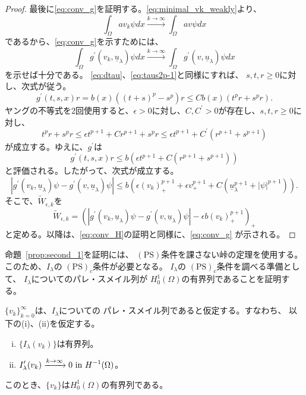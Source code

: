 \begin{proof}
 最後に\eqref{eq:conv_g}を証明する。\eqref{eq:minimal_vk_weakly}より、
 \[
  \int_\Omega a v_k \psi dx \xrightarrow{k \to \infty} \int_\Omega
 av\psi dx
 \]
 であるから、\eqref{eq:conv_g}を示すためには、
 \[
  \int_\Omega g^\prime(v_k, \underline{u}_\lambda)\psi dx \xrightarrow{
  k \to \infty } 
  \int_\Omega g^\prime(v, \underline{u}_\lambda)\psi dx
 \]
 を示せば十分である。
 \eqref{eq:dtau}、\eqref{eq:taus2p-1}と同様にすれば、
 $s, t, r \geq 0$に対し、次式が従う。
 \[
  g^\prime(t, s, x)r = b(x) \left( (t+s)^p - s^p \right) r \leq C b(x)
 \left( t^pr + s^p r \right).
 \]
 ヤングの不等式を$2$回使用すると、$\epsilon > 0$に対し、$C, C^\prime >
 0$が存在し、$s, t, r \geq 0$に対し、
 \[
  t^p r + s^p r \leq \epsilon t^{p+1} + C r^{p+1} + s^p r \leq
 \epsilon t^{p+1} + C^\prime (r^{p+1} + s^{p+1})
 \]
 が成立する。ゆえに、$g^\prime$は
 \[
  g^\prime(t, s, x)r \leq b \left( \epsilon t^{p+1} + C ( r^{p+1} +
 s^{p+1}) \right)
 \]
 と評価される。したがって、次式が成立する。
 \[  
  \left\lvert g^\prime(v_k, \underline{u}_\lambda)\psi - g^\prime(v,
   \underline{u}_\lambda)\psi \right\rvert \leq b \left( \epsilon
   (v_k)_+^{p+1}  + \epsilon v_+^{p+1} + C
   (\underline{u}_\lambda^{p+1} + \lvert \psi \rvert^{p+1})
                                 \right).
 \]
 そこで、$\tilde{W}_{\epsilon, k}$を
\[  \tilde{W}_{\epsilon, k} = 
   \left( \left\lvert g^\prime(v_k, \underline{u}_\lambda)\psi - g^\prime(v,
    \underline{u}_\lambda)\psi \right\rvert
  -\epsilon b (v_k)_+^{p+1}
          \right)_+ \]
 と定める。以降は、\eqref{eq:conv_H}の証明と同様に、\eqref{eq:conv_g}
 が示される。\qedhere
\end{proof}

命題~\ref{prop:second_1}を証明には、
$(\mathrm{PS})$条件を課さない峠の定理を使用する。
このため、$I_\lambda$の
$(\mathrm{PS})_c$条件が必要となる。
$I_\lambda$の
$(\mathrm{PS})_c$条件を調べる準備として、
$I_\lambda$についてのパレ・スメイル列が
$H_0^1(\Omega)$の有界列であることを証明する。

\begin{lem} \label{lem:PS_seq}
 $\{ v_k \}_{k=0}^\infty$は、$I_\lambda$についての
 パレ・スメイル列であると仮定する。すなわち、
 以下の(i)、(ii)を仮定する。
 \begin{enumerate}[(i)]
  \item $\{ I_\lambda(v_k) \}$は有界列。
  \item $\displaystyle I^\prime_{\lambda} (v_k) \xrightarrow{k \to
        \infty} 0 ~\text{in}~ H^{-1}(\Omega)$。
 \end{enumerate}
 このとき、$\{ v_k \}$は$H_0^1(\Omega)$の有界列である。
\end{lem}

